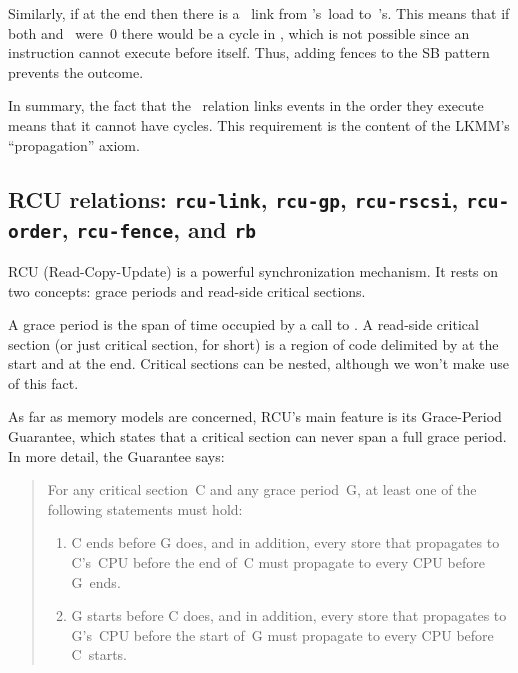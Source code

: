 Similarly, if  at the end then there is a ~link from
's~load to~'s.
This means that if both  and~ were~0 there would be a
cycle in , which is not possible since an instruction cannot execute
before itself.
Thus, adding  fences to the SB pattern prevents
the  outcome.

In summary, the fact that the ~relation links events in the order
they execute means that it cannot have cycles.
This requirement is the content of the LKMM's ``propagation'' axiom.


\subsection{RCU relations: \texttt{rcu-link}, \texttt{rcu-gp}, \texttt{rcu-rscsi}, \texttt{rcu-order}, \texttt{rcu-fence}, and \texttt{rb}}
\label{sec:docs:explanation:RCU relations: rcu-link, rcu-gp, rcu-rscsi, rcu-order, rcu-fence, and rb}

RCU (Read-Copy-Update) is a powerful synchronization mechanism.
It rests on two concepts: grace periods and read-side critical sections.

A grace period is the span of time occupied by a call to
.
A read-side critical section (or just critical section, for short) is
a region of code delimited by  at the start and
 at the end.
Critical sections can be nested, although we won't make use of this fact.

As far as memory models are concerned, RCU's main feature is its
Grace-Period Guarantee, which states that a critical section can never
span a full grace period.
In more detail, the Guarantee says:

\begin{quote}
  For any critical section~C and any grace period~G, at least one of
  the following statements must hold:

  \begin{enumerate}
  \item	C ends before G does, and in addition, every store that
	propagates to C's~CPU before the end of~C must propagate to
	every CPU before G~ends.

  \item	G starts before C does, and in addition, every store that
	propagates to G's~CPU before the start of~G must propagate
	to every CPU before C~starts.
  \end{enumerate}
\end{quote}

